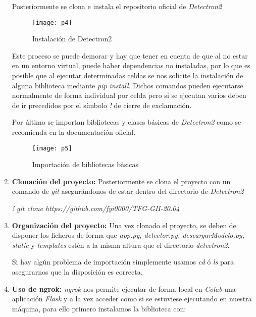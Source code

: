 \begin{enumerate}
    Posteriormente se clona e instala el repositorio oficial de \emph{Detectron2}
    
    \begin{figure}[htb]
	\centering
	\texttt{[image: p4]}
	\caption[Instalación de Detectron2]{Instalación de Detectron2}
    \end{figure}
    
    Este proceso se puede demorar y hay que tener en cuenta de que al no estar en un entorno virtual, puede haber dependencias no instaladas, por lo que es posible que al ejecutar determinadas celdas se nos solicite la instalación de alguna biblioteca mediante \emph{pip install}. Dichos comandos pueden ejecutarse normalmente de forma individual por celda pero si se ejecutan varios deben de ir precedidos por el símbolo \emph{!} de cierre de exclamación.
    
    Por último se importan bibliotecas y clases básicas de \emph{Detectron2} como se recomienda en la documentación oficial.
    
    \begin{figure}[htb]
	\centering
	\texttt{[image: p5]}
	\caption[Importación de bibliotecas básicas]{Importación de bibliotecas básicas}
    \end{figure}
    
    \item \textbf{Clonación del proyecto:} Posteriormente se clona el proyecto con un comando de \emph{git} asegurándonos de estar dentro del directorio de \emph{Detectron2}
    
    \emph{! git clone https://github.com/fyi0000/TFG-GII-20.04}
    
    \item \textbf{Organización del proyecto:} Una vez clonado el proyecto, se deben de disponer los ficheros de forma que \emph{app.py, detector.py, descargarModelo.py, static} y \emph{templates} estén a la misma altura que el directorio \emph{detectron2}.
    
    Si hay algún problema de importación simplemente usamos \emph{cd} ó \emph{ls} para asegurarnos que la disposición es correcta.
    
    \item \textbf{Uso de ngrok:} \emph{ngrok} nos permite ejecutar de forma local en \emph{Colab} una aplicación \emph{Flask} y a la vez acceder como si se estuviese ejecutando en nuestra máquina, para ello primero instalamos la biblioteca con:
    

\end{enumerate}
